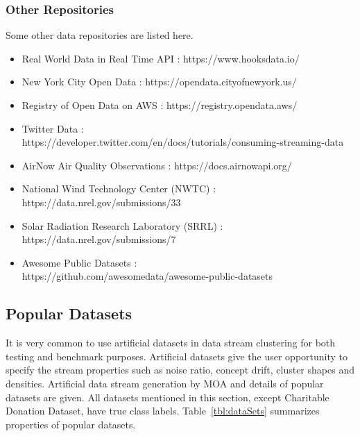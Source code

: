 \documentclass[smallcondensed]{svjour3}     %
\begin{document}
\subsubsection{Other Repositories}
Some other data repositories are listed here.
\begin{itemize}
 \item Real World Data in Real Time API : https://www.hooksdata.io/
 \item New York City Open Data : https://opendata.cityofnewyork.us/
 \item Registry of Open Data on AWS : https://registry.opendata.aws/
 \item Twitter Data :\\ https://developer.twitter.com/en/docs/tutorials/consuming-streaming-data
 \item AirNow Air Quality Observations : https://docs.airnowapi.org/
 \item National Wind Technology Center (NWTC) :\\ https://data.nrel.gov/submissions/33
 \item Solar Radiation Research Laboratory (SRRL) :\\ https://data.nrel.gov/submissions/7
 \item Awesome Public Datasets :\\ https://github.com/awesomedata/awesome-public-datasets
\end{itemize}

\subsection{Popular Datasets}
It is very common to use artificial datasets in data stream clustering for both testing and benchmark purposes. Artificial datasets give the user opportunity to specify the stream properties such as noise ratio, concept drift, cluster shapes and densities. Artificial data stream generation by MOA and details of popular datasets are given. All datasets mentioned in this section, except Charitable Donation Dataset, have true class labels. Table~\ref{tbl:dataSets} summarizes properties of popular datasets.
\end{document}
